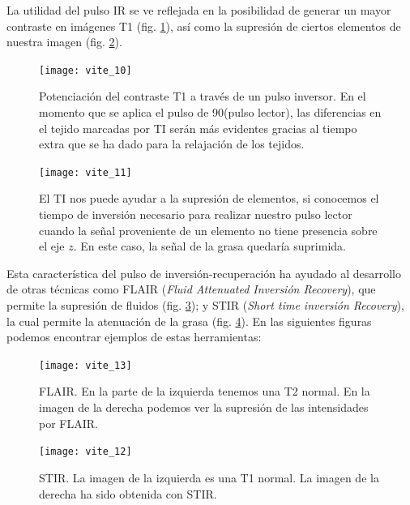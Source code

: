 La utilidad del pulso IR se ve reflejada en la posibilidad de generar un mayor contraste en imágenes T1 (fig. \ref{fig:seq_RealIR}), así como la supresión de ciertos elementos de nuestra imagen (fig. \ref{fig:seq_supresion}). 

\begin{figure}[htb]
\begin{figg}
   \texttt{[image: vite\_10]}
   \caption{Potenciación del contraste T1 a través de un pulso inversor. En el momento que se aplica el pulso de 90\degrees (pulso lector), las diferencias en el tejido marcadas por TI serán más evidentes gracias al tiempo extra que se ha dado para la relajación de los tejidos.}
 \label{fig:seq_RealIR}
 \end{figg}
\end{figure}

\begin{figure}[htb]
\begin{figg}
   \texttt{[image: vite\_11]}
   \caption{ El TI nos puede ayudar a la supresión de elementos, si conocemos el tiempo de inversión necesario para realizar nuestro pulso lector cuando la señal proveniente de un elemento no tiene presencia sobre el eje $z$. En este caso, la señal de la grasa quedaría suprimida.}
 \label{fig:seq_supresion}
 \end{figg}
\end{figure}




Esta característica del pulso de inversión-recuperación ha ayudado al desarrollo de otras técnicas como FLAIR (\textit{Fluid Attenuated Inversión Recovery}), que permite la supresión de fluidos (fig. \ref{fig:seq_FLAIR}); y STIR (\textit{Short time inversión Recovery}), la cual permite la atenuación de la grasa (fig. \ref{fig:seq_STIR}). En las siguientes figuras podemos encontrar ejemplos de estas herramientas:



\begin{figure}[htb]
\begin{figg}
   \texttt{[image: vite\_13]}
   \caption{FLAIR. En la parte de la izquierda tenemos una T2 normal. En la imagen de la derecha podemos ver la supresión de las intensidades por FLAIR.}
 \label{fig:seq_FLAIR}
 \end{figg}
 \end{figure}
 
 
\begin{figure}[htb]
\begin{figg}
   \texttt{[image: vite\_12]}
   \caption{STIR. La imagen de la izquierda es una T1 normal. La imagen de la derecha ha sido obtenida con STIR.}
 \label{fig:seq_STIR}
 \end{figg}
\end{figure}



